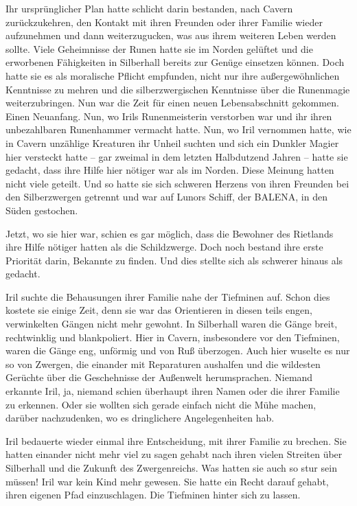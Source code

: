 Ihr ursprünglicher Plan hatte schlicht darin bestanden, nach Cavern zurückzukehren, den Kontakt mit ihren Freunden oder ihrer Familie wieder aufzunehmen und dann weiterzugucken, was aus ihrem weiteren Leben werden sollte. Viele Geheimnisse der Runen hatte sie im Norden gelüftet und die erworbenen Fähigkeiten in Silberhall bereits zur Genüge einsetzen können. Doch hatte sie es als moralische Pflicht empfunden, nicht nur ihre außergewöhnlichen Kenntnisse zu mehren und die silberzwergischen Kenntnisse über die Runenmagie weiterzubringen. Nun war die Zeit für einen neuen Lebensabschnitt gekommen. Einen Neuanfang. Nun, wo Irils Runenmeisterin verstorben war und ihr ihren unbezahlbaren Runenhammer vermacht hatte. Nun, wo Iril vernommen hatte, wie in Cavern unzählige Kreaturen ihr Unheil suchten und sich ein Dunkler Magier hier versteckt hatte – gar zweimal in dem letzten Halbdutzend Jahren – hatte sie gedacht, dass ihre Hilfe hier nötiger war als im Norden. Diese Meinung hatten nicht viele geteilt. Und so hatte sie sich schweren Herzens von ihren Freunden bei den Silberzwergen getrennt und war auf Lunors Schiff, der BALENA, in den Süden gestochen.

Jetzt, wo sie hier war, schien es gar möglich, dass die Bewohner des Rietlands ihre Hilfe nötiger hatten als die Schildzwerge. Doch noch bestand ihre erste Priorität darin, Bekannte zu finden. Und dies stellte sich als schwerer hinaus als gedacht.

Iril suchte die Behausungen ihrer Familie nahe der Tiefminen auf. Schon dies kostete sie einige Zeit, denn sie war das Orientieren in diesen teils engen, verwinkelten Gängen nicht mehr gewohnt. In Silberhall waren die Gänge breit, rechtwinklig und blankpoliert. Hier in Cavern, insbesondere vor den Tiefminen, waren die Gänge eng, unförmig und von Ruß überzogen. Auch hier wuselte es nur so von Zwergen, die einander mit Reparaturen aushalfen und die wildesten Gerüchte über die Geschehnisse der Außenwelt herumsprachen. Niemand erkannte Iril, ja, niemand schien überhaupt ihren Namen oder die ihrer Familie zu erkennen. Oder sie wollten sich gerade einfach nicht die Mühe machen, darüber nachzudenken, wo es dringlichere Angelegenheiten hab.

Iril bedauerte wieder einmal ihre Entscheidung, mit ihrer Familie zu brechen. Sie hatten einander nicht mehr viel zu sagen gehabt nach ihren vielen Streiten über Silberhall und die Zukunft des Zwergenreichs. Was hatten sie auch so stur sein müssen! Iril war kein Kind mehr gewesen. Sie hatte ein Recht darauf gehabt, ihren eigenen Pfad einzuschlagen. Die Tiefminen hinter sich zu lassen.

